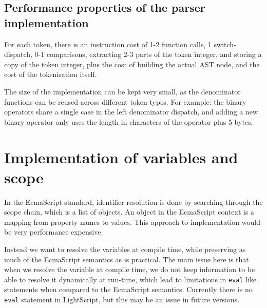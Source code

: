 \documentclass[11pt]{report}
\begin{document}
\subsection{Performance properties of the parser implementation}

For each token, there is an instruction cost of 1-2 function calls, 1 switch-dispatch, 0-1 comparisons, extracting 2-3 parts of the token integer, and storing a copy of the token integer, plus the cost of building the actual AST node, and the cost of the tokenisation itself.

The size of the implementation can be kept very small, as the denominator functions can be reused across different token-types. For example: the binary operators share a single case in the left denominator dispatch, and adding a new binary operator only uses the length in characters of the operator plus 5 bytes. 

\section{Implementation of variables and scope}
In the EcmaScript standard, identifier resolution is done by searching through the scope chain, which is a list of objects. An object in the EcmaScript context is a mapping from property names to values. This approach to implementation would be very performance expensive.

Instead we want to resolve the variables at compile time, while preserving as much of the EcmaScript semantics as is practical. The main issue here is that when we resolve the variable at compile time, we do not keep information to be able to resolve it dynamically at run-time,
which lead to limitations in \verb|eval| like statements when compared to the EcmaScript semantics. Currently there is no \verb|eval| statement in LightScript, but this may be an issue in future versions.
\end{document}
